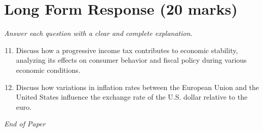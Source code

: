 \documentclass[12pt]{article}
\begin{document}
\section*{Long Form Response (20 marks)}
\textit{Answer each question with a clear and complete explanation.}
\begin{enumerate}[label=\arabic*.]
\setcounter{enumi}{10}
\item Discuss how a progressive income tax contributes to economic stability, analyzing its
effects on consumer behavior and fiscal policy during various economic conditions.
\item Discuss how variations in inflation rates between the European Union and the United States
influence the exchange rate of the U.S. dollar relative to the euro.
\end{enumerate}

\vfill
\noindent\textit{End of Paper}
\end{document}
